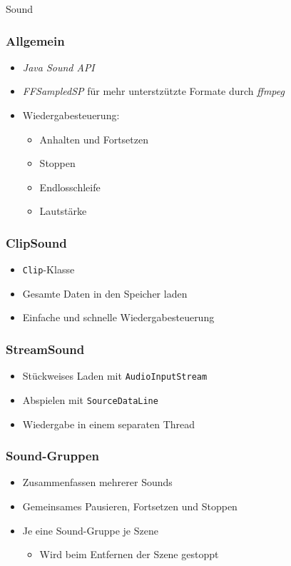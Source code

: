 \begin{frame}
	\begin{center}
		\Huge Sound
	\end{center}
\end{frame}

\begin{frame}
	\frametitle{Allgemein}
	\begin{itemize}
		\item \textit{Java Sound API}
		\item \textit{FFSampledSP} für mehr unterstzützte Formate durch \textit{ffmpeg}
		\item Wiedergabesteuerung:
		\begin{itemize}
			\item Anhalten und Fortsetzen
			\item Stoppen
			\item Endlosschleife
			\item Lautstärke
		\end{itemize}
	\end{itemize}
\end{frame}

\begin{frame}
	\frametitle{ClipSound}
	\begin{itemize}
		\item \texttt{Clip}-Klasse
		\item Gesamte Daten in den Speicher laden
		\item Einfache und schnelle Wiedergabesteuerung
	\end{itemize}
\end{frame}

\begin{frame}
	\frametitle{StreamSound}
	\begin{itemize}
		\item Stückweises Laden mit \texttt{AudioInputStream}
		\item Abspielen mit \texttt{SourceDataLine}
		\item Wiedergabe in einem separaten Thread
	\end{itemize}
\end{frame}

\begin{frame}
	\frametitle{Sound-Gruppen}
	\begin{itemize}
		\item Zusammenfassen mehrerer Sounds
		\item Gemeinsames Pausieren, Fortsetzen und Stoppen
		\item Je eine Sound-Gruppe je Szene
		\begin{itemize}
			\item Wird beim Entfernen der Szene gestoppt
		\end{itemize}
	\end{itemize}
\end{frame}